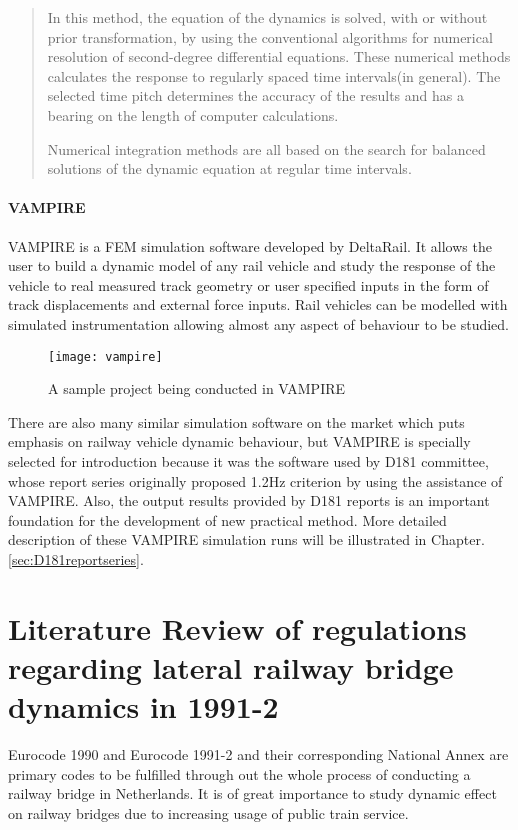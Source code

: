 \begin{appendices}
\begin{quote}
In this method, the equation of the dynamics is solved, with or without prior transformation, by using the conventional algorithms for numerical resolution of second-degree differential equations. These numerical methods calculates the response to regularly spaced time intervals(in general). The selected time pitch determines the accuracy of the results and has a bearing on the length of computer calculations.

Numerical integration methods are all based on the search for balanced solutions of the dynamic equation at regular time intervals.

\end{quote}

\subsubsection{VAMPIRE}

VAMPIRE is a FEM simulation software developed by DeltaRail. It allows the user to build a dynamic model of any rail vehicle and study the response of the vehicle to real measured track geometry or user specified inputs in the form of track displacements and external force inputs. Rail vehicles can be modelled with simulated instrumentation allowing almost any aspect of behaviour to be studied. 

\begin{figure}[h!]
    \centering
    \texttt{[image: vampire]}
    \caption{A sample project being conducted in VAMPIRE}
    \label{fig:vampire}
\end{figure}

There are also many similar simulation software on the market which puts emphasis on railway vehicle dynamic behaviour, but VAMPIRE is specially selected for introduction because it was the software used by D181 committee, whose report series originally proposed 1.2Hz criterion by using the assistance of VAMPIRE. Also, the output results provided by D181 reports is an important foundation for the development of new practical method. More detailed description of these VAMPIRE simulation runs will be illustrated in Chapter.\ref{sec:D181reportseries}.

\chapter{Literature Review of regulations regarding lateral railway bridge dynamics in 1991-2} 
Eurocode 1990 and Eurocode 1991-2 and their corresponding National Annex are primary codes to be fulfilled through out the whole process of conducting a railway bridge in Netherlands. It is of great importance to study dynamic effect on railway bridges due to increasing usage of public train service.


\end{appendices}
